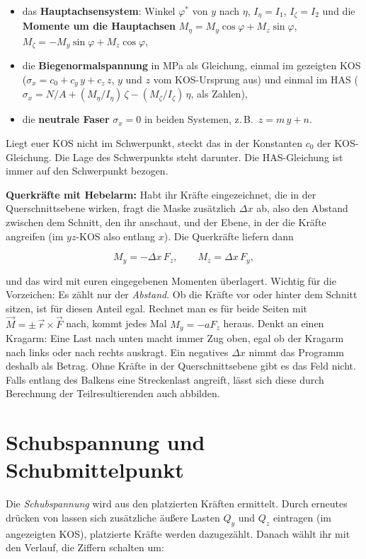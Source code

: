 \begin{itemize}
  \item das \textbf{Hauptachsensystem}: Winkel $\varphi^*$ von $y$ nach $\eta$, $I_\eta = I_1$,
        $I_\zeta = I_2$ und die \textbf{Momente um die Hauptachsen}
        $M_\eta = M_y\cos\varphi + M_z\sin\varphi$, $M_\zeta = -M_y\sin\varphi + M_z\cos\varphi$,
  \item die \textbf{Biegenormalspannung} in MPa als Gleichung, einmal im gezeigten KOS
        ($\sigma_x = c_0 + c_y\,y + c_z\,z$, $y$ und $z$ vom KOS-Ursprung aus) und einmal im HAS
        ($\sigma_x = N/A + (M_\eta/I_\eta)\,\zeta - (M_\zeta/I_\zeta)\,\eta$, als Zahlen),
  \item die \textbf{neutrale Faser} $\sigma_x = 0$ in beiden Systemen, z.\,B.\ $z = m\,y + n$.
\end{itemize}

Liegt euer KOS nicht im Schwerpunkt, steckt das in der Konstanten $c_0$ der KOS-Gleichung. Die
Lage des Schwerpunkts steht darunter. Die HAS-Gleichung ist immer auf den Schwerpunkt bezogen.

\textbf{Querkräfte mit Hebelarm:} Habt ihr Kräfte eingezeichnet, die in der Querschnittsebene
wirken, fragt die Maske zusätzlich $\Delta x$ ab, also den Abstand zwischen dem Schnitt, den ihr
anschaut, und der Ebene, in der die Kräfte angreifen (im $yz$-KOS also entlang $x$). Die
Querkräfte liefern dann

\[
  M_y = -\Delta x\,F_z, \qquad M_z = \Delta x\,F_y ,
\]

und das wird mit euren eingegebenen Momenten überlagert. Wichtig für die Vorzeichen: Es zählt
nur der \emph{Abstand}. Ob die Kräfte vor oder hinter dem Schnitt sitzen, ist für diesen Anteil
egal. Rechnet man es für beide Seiten mit $\vec M = \pm\,\vec r \times \vec F$ nach, kommt
jedes Mal $M_y = -a F_z$ heraus. Denkt an einen Kragarm: Eine Last nach unten macht immer Zug
oben, egal ob der Kragarm nach links oder nach rechts auskragt. Ein negatives $\Delta x$ nimmt
das Programm deshalb als Betrag. Ohne Kräfte in der Querschnittsebene gibt es das Feld nicht.
Falls entlang des Balkens eine Streckenlast angreift, lässt sich diese durch Berechnung der Teilresultierenden auch abbilden.

\section{Schubspannung und Schubmittelpunkt}

Die \emph{Schubspannung} wird aus den platzierten Kräften ermittelt. Durch erneutes drücken von 
lassen sich zusätzliche äußere Lasten $Q_y$ und $Q_z$ eintragen (im angezeigten KOS), platzierte
Kräfte werden dazugezählt. Danach wählt ihr mit  den Verlauf, die Ziffern schalten um:

